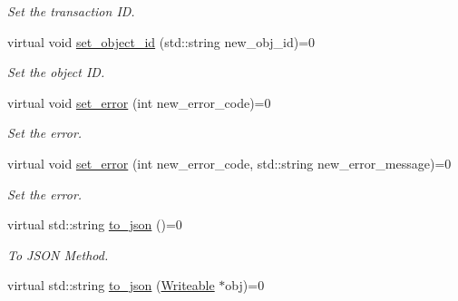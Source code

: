 \begin{DoxyCompactItemize}
\begin{DoxyCompactList}\small\item\em Set the transaction I\-D. \end{DoxyCompactList}\item 
\hypertarget{classApplicationResponseInterface_afd1ed312a1f4c10603347759646dc82a}{virtual void \hyperlink{classApplicationResponseInterface_afd1ed312a1f4c10603347759646dc82a}{set\-\_\-object\-\_\-id} (std\-::string new\-\_\-obj\-\_\-id)=0}\label{classApplicationResponseInterface_afd1ed312a1f4c10603347759646dc82a}

\begin{DoxyCompactList}\small\item\em Set the object I\-D. \end{DoxyCompactList}\item 
\hypertarget{classApplicationResponseInterface_ab04aa279ba46c78750b13faa432d16b2}{virtual void \hyperlink{classApplicationResponseInterface_ab04aa279ba46c78750b13faa432d16b2}{set\-\_\-error} (int new\-\_\-error\-\_\-code)=0}\label{classApplicationResponseInterface_ab04aa279ba46c78750b13faa432d16b2}

\begin{DoxyCompactList}\small\item\em Set the error. \end{DoxyCompactList}\item 
\hypertarget{classApplicationResponseInterface_a0d0264f009db96704fbbed000d209e20}{virtual void \hyperlink{classApplicationResponseInterface_a0d0264f009db96704fbbed000d209e20}{set\-\_\-error} (int new\-\_\-error\-\_\-code, std\-::string new\-\_\-error\-\_\-message)=0}\label{classApplicationResponseInterface_a0d0264f009db96704fbbed000d209e20}

\begin{DoxyCompactList}\small\item\em Set the error. \end{DoxyCompactList}\item 
\hypertarget{classApplicationResponseInterface_a8ab1233d629396ff1783aa903288c61d}{virtual std\-::string \hyperlink{classApplicationResponseInterface_a8ab1233d629396ff1783aa903288c61d}{to\-\_\-json} ()=0}\label{classApplicationResponseInterface_a8ab1233d629396ff1783aa903288c61d}

\begin{DoxyCompactList}\small\item\em To J\-S\-O\-N Method. \end{DoxyCompactList}\item 
\hypertarget{classApplicationResponseInterface_a26e212e2b67df8667d3c725634a06911}{virtual std\-::string \hyperlink{classApplicationResponseInterface_a26e212e2b67df8667d3c725634a06911}{to\-\_\-json} (\hyperlink{classWriteable}{Writeable} $\ast$obj)=0}\label{classApplicationResponseInterface_a26e212e2b67df8667d3c725634a06911}


\end{DoxyCompactItemize}
